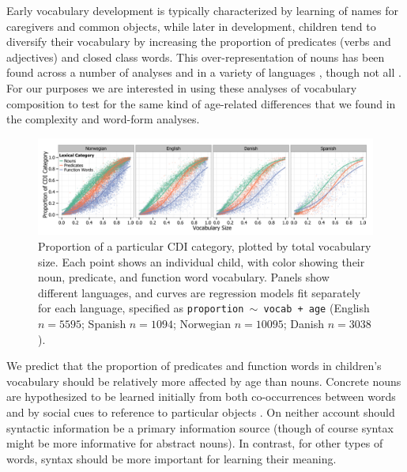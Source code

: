 \documentclass[10pt,letterpaper]{article}
\begin{document}
Early vocabulary development is typically characterized by learning of names for caregivers and common objects, while later in development, children tend to diversify their vocabulary by increasing the proportion of predicates (verbs and adjectives) and closed class words. This over-representation of nouns has been found across a number of analyses and in a variety of languages \cite{bates1994,caselli1995,bornstein2004}, though not all \cite{tardif1996,choi1995}.
For our purposes we are interested in using these analyses of vocabulary composition to test for the same kind of age-related differences that we found in the complexity and word-form analyses. 

\begin{figure}
\begin{center}
\includegraphics[width=\linewidth]{plots/composition_fit.png}
\end{center}
\caption{\label{fig:vocab_comp} Proportion of a particular CDI category, plotted by total vocabulary size. Each point shows an individual child, with color showing their noun, predicate, and function word vocabulary. Panels show different languages, and curves are regression models fit separately for each language, specified as \small{\tt{proportion $\sim$ vocab + age}} (English $n=5595$; Spanish $n=1094$; Norwegian $n=10095$; Danish $n=3038$).}
\end{figure}

We predict that the proportion of predicates and function words in children's vocabulary should be relatively more affected by age than nouns. Concrete nouns are hypothesized to be learned initially from both co-occurrences between words \cite{yu2007b} and by social cues to reference to particular objects \cite{bloom2002}. On neither account should syntactic information be a primary information source (though of course syntax might be more informative for abstract nouns). In contrast, for other types of words, syntax should be more important for learning their meaning.
\end{document}
